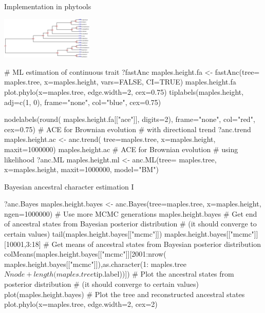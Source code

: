 \documentclass[compress, ucs, xelatex, 11pt, xcolor=svgnames, aspectratio=169,
	hyperref={
		bookmarks=true,
		unicode=true,
		colorlinks=true,
		pdftitle={Molecular data in R},
		plainpages=false,
		pdfauthor={Vojtech Zeisek},
		pdfsubject={Course about phylogeny and evolution in R},
		pdfcreator={XeLaTeX},
		pdfkeywords={R, evolution, phylogeny, molecular data},
		linkcolor=Crimson, %
		anchorcolor=Magenta, %
		citecolor=Magenta, %
		filecolor=Magenta, %
		menucolor=Magenta, %
		urlcolor=DodgerBlue, %
		pdftex},
	url={hyphens, lowtilde} %
	]{beamer}
\begin{document}
\begin{frame}[fragile]{Implementation in phytools}
	\begin{multicols}{2}
		\vfill
		\begin{center}
			\includegraphics[height=2cm]{ancml.png}
		\end{center}
		\begin{spluscode}
    # ML estimation of continuous trait
    ?fastAnc
    maples.height.fa <- fastAnc(tree=
      maples.tree, x=maples.height,
      vars=FALSE, CI=TRUE)
    maples.height.fa
    plot.phylo(x=maples.tree,
      edge.width=2, cex=0.75)
    tiplabels(maples.height,
      adj=c(1, 0), frame="none",
      col="blue", cex=0.75)
		\end{spluscode}
		\vfill
		\columnbreak
		\begin{spluscode}
    nodelabels(round(
      maples.height.fa[["ace"]],
      digits=2), frame="none",
      col="red", cex=0.75)
    # ACE for Brownian evolution
    # with directional trend
    ?anc.trend
    maples.height.ac <- anc.trend(
      tree=maples.tree,
      x=maples.height, maxit=1000000)
    maples.height.ac
    # ACE for Brownian evolution
    # using likelihood
    ?anc.ML
    maples.height.ml <- anc.ML(tree=
      maples.tree, x=maples.height,
      maxit=1000000, model="BM")
		\end{spluscode}
	\end{multicols}
\end{frame}

\begin{frame}[fragile]{Bayesian ancestral character estimation I}
	\begin{spluscode}
    ?anc.Bayes
    maples.height.bayes <- anc.Bayes(tree=maples.tree, x=maples.height,
      ngen=1000000) # Use more MCMC generations
    maples.height.bayes
    # Get end of ancestral states from Bayesian posterior distribution
    # (it should converge to certain values)
    tail(maples.height.bayes[["mcmc"]])
    maples.height.bayes[["mcmc"]][10001,3:18]
    # Get means of ancestral states from Bayesian posterior distribution
    colMeans(maples.height.bayes[["mcmc"]][2001:nrow(
      maples.height.bayes[["mcmc"]]),as.character(1:
      maples.tree$Nnode+length(maples.tree$tip.label))])
    # Plot the ancestral states from posterior distribution
    # (it should converge to certain values)
    plot(maples.height.bayes)
    # Plot the tree and reconstructed ancestral states
    plot.phylo(x=maples.tree, edge.width=2, cex=2)
	\end{spluscode}
\end{frame}
\end{document}
